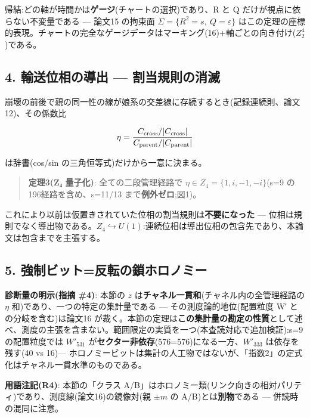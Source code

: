 \documentclass[
]{ltjsarticle}
\begin{document}
帰結:どの軸が時間かは\textbf{ゲージ}(チャートの選択)であり、R と Q
だけが視点に依らない不変量である --- 論文15 の拘束面
\(\Sigma=\{R^2=s,\ Q=\varepsilon\}\)
はこの定理の座標的表現。チャートの完全なゲージデータはマーキング(16)+軸ごとの向き付け(\(Z_2^{4}\))である。

\subsection{4. 輸送位相の導出 ---
割当規則の消滅}\label{ux8f38ux9001ux4f4dux76f8ux306eux5c0eux51fa-ux5272ux5f53ux898fux5247ux306eux6d88ux6ec5}

崩壊の前後で親の同一性の線が娘系の交差線に存続するとき(記録連続則、論文12)、その係数比

\[
\eta=\frac{C_{\rm cross}/|C_{\rm cross}|}{C_{\rm parent}/|C_{\rm parent}|}
\]

は辞書(cos/sin の三角恒等式)だけから一意に決まる。

\begin{quote}
\textbf{定理3(Z₄ 量子化)}: 全ての二段管理経路で
\(\eta\in Z_4=\{1,i,-1,-i\}\)(s=9 の196経路を含め、s=11/13
まで\textbf{例外ゼロ};図1)。
\end{quote}

これにより以前は仮置きされていた位相の割当規則は\textbf{不要になった}
---
位相は規則でなく導出物である。\(Z_4\hookrightarrow U(1)\):連続位相は導出位相の包含先であり、本論文は包含までを主張する。

\subsection{5.
強制ビット=反転の鎖ホロノミー}\label{ux5f37ux5236ux30d3ux30c3ux30c8ux53cdux8ee2ux306eux9396ux30dbux30edux30ceux30dfux30fc}

\textbf{診断量の明示(指摘 \#4)}: 本節の \(z\)
は\textbf{チャネル一貫和}(チャネル内の全管理経路の \(\eta\)
和)であり、一つの特定の集計量である --- その測度論的地位(配置粒度 W′
との分岐を含む)は論文16
が裁く。本節の定理は\textbf{この集計量の勘定の性質}として述べ、測度の主張を含まない。範囲限定の実質を一つ(本査読対応で追加検証):s=9
の配置粒度では \(W'_{531}\)
が\textbf{セクター非依存}(576=576)になる一方、\(W'_{333}\)
は依存を残す(40 vs 16)---
ホロノミービットは集計の人工物ではないが、「指数2」の定式化はチャネル一貫水準のものである。

\textbf{用語注記(R4)}: 本節の「クラス
A/B」はホロノミー類(リンク向きの相対パリティ)であり、測度線(論文16)の鏡像対(親
\(\pm m\) の A/B)とは\textbf{別物}である --- 併読時の混同に注意。
\end{document}
